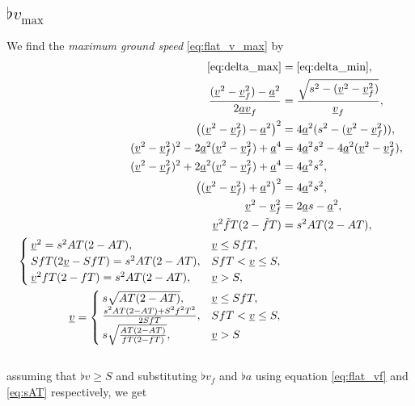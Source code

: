 \subsection{\texorpdfstring{$\flat{v}_{\max}$}{flat v\_max}}
\label{app:derive_flat_v_max}
We find the \emph{maximum ground speed} \eqref{eq:flat_v_max} by
\begin{align}
\nonumber
\eqref{eq:delta_max} &= \eqref{eq:delta_min},\\
\nonumber
\frac{(\flat{v}^2 - \flat{v}_f^2) - \flat{a}^2}{2 \flat{a}\flat{v}_f} &= \frac{\sqrt{s^2 - (\flat{v}^2 - \flat{v}_f^2)}}{\flat{v}_f},\\
\nonumber
\left((\flat{v}^2 - \flat{v}_f^2) - \flat{a}^2\right)^2 &= 4 \flat{a}^2(s^2 - (\flat{v}^2 - \flat{v}_f^2)),\\
\nonumber
(\flat{v}^2 - \flat{v}_f^2)^2 - 2 \flat{a}^2(\flat{v}^2 - \flat{v}_f^2) + \flat{a}^4 &= 4 \flat{a}^2s^2 - 4 \flat{a}^2 (\flat{v}^2 - \flat{v}_f^2),\\
\nonumber
(\flat{v}^2 - \flat{v}_f^2)^2 + 2 \flat{a}^2(\flat{v}^2 - \flat{v}_f^2) + \flat{a}^4 &= 4 \flat{a}^2 s^2,\\
\nonumber
\left((\flat{v}^2 - \flat{v}_f^2) + \flat{a}^2\right)^2 &= 4 \flat{a}^2s^2,\\
\label{eq:maxgs}
\flat{v}^2 - \flat{v}_f^2 &= 2 \flat{a} s - \flat{a}^2,\\
\label{eq:maxgs_f_tilde}
\flat{v}^2 \tilde{f}T (2 - \tilde{f}T) &= s^2 AT(2 - AT),\\
\begin{cases}
\flat{v}^2 = s^2 AT(2 - AT), &\flat{v} \le S fT,\\
S fT (2 \flat{v} - S fT) = s^2 AT(2 - AT), &S fT < \flat{v} \le S,\\
\flat{v}^2 fT (2 - fT) = s^2 AT(2 - AT), &\flat{v} > S,\\
\end{cases}\\
\flat{v} =
\begin{cases}
s \sqrt{AT(2 - AT)}, &\flat{v} \le S fT,\\
\frac{s^2 AT(2 - AT) + S^2 f^2 T^2}{2 S fT}, &S fT < \flat{v} \le S,\\
s \sqrt{\frac{AT(2 - AT)}{fT (2 - fT)}}, &\flat{v} > S\\
\end{cases}
\end{align}\\
assuming that $\flat{v} \ge S$ and substituting $\flat{v}_f$ and $\flat{a}$ using equation \eqref{eq:flat_vf} and \eqref{eq:sAT} respectively, we get
